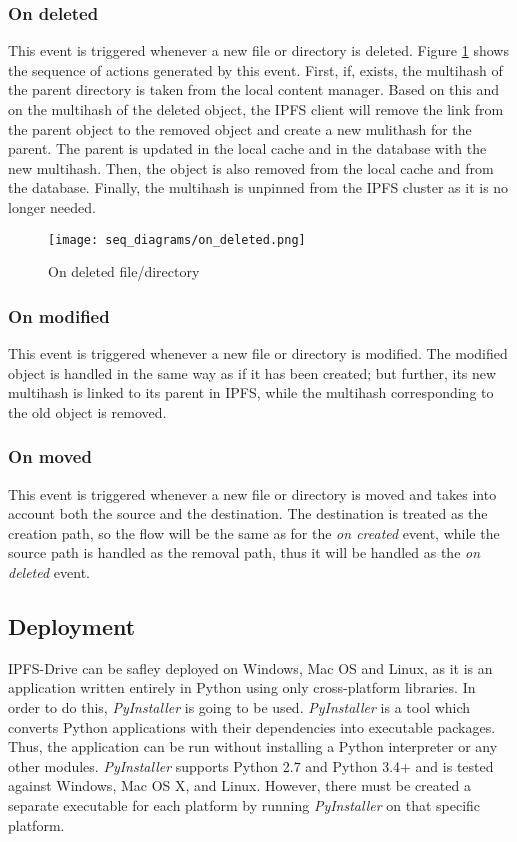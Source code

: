 \documentclass[12pt]{report}
\begin{document}
\subsubsection{On deleted}
This event is triggered whenever a new file or directory is deleted. Figure \ref {fig:ondeleted} shows the sequence of actions generated by this event. First, if, exists, the multihash of the parent directory is taken from the local content manager. Based on this and on the multihash of the deleted object, the IPFS client will remove the link from the parent object to the removed object and create a new mulithash for the parent. The parent is updated in the local cache and in the database with the new multihash. Then, the object is also removed from the local cache and from the database. Finally, the multihash is unpinned from the IPFS cluster as it is no longer needed. 

\begin{figure}[H]
\centerline{\texttt{[image: seq\_diagrams/on\_deleted.png]}}
    \caption{On deleted file/directory}
    \label{fig:ondeleted}
\end{figure}

\subsubsection{On modified}
This event is triggered whenever a new file or directory is modified. The modified object is handled in the same way as if it has been created; but further, its new multihash is linked to its parent in IPFS, while the multihash corresponding to the old object is removed.

\subsubsection{On moved}
This event is triggered whenever a new file or directory is moved and takes into account both the source and the destination. The destination is treated as the creation path, so the flow will be the same as for the \textit{on created} event, while the source path is handled as the removal path, thus it will be handled as the \textit{on deleted} event.


\subsection{Deployment}

IPFS-Drive can be safley deployed on Windows, Mac OS and Linux, as it is an application written entirely in Python using only cross-platform libraries. In order to do this, \textit{PyInstaller} \cite{pyinstaller} is going to be used. \textit{PyInstaller} is a tool which converts Python applications with their dependencies into executable packages. Thus, the application can be run without installing a Python interpreter or any other modules. \textit{PyInstaller} supports Python 2.7 and Python 3.4+ and is tested against Windows, Mac OS X, and Linux. However, there must be created a separate executable for each platform by running \textit{PyInstaller} on that specific platform.
\end{document}
